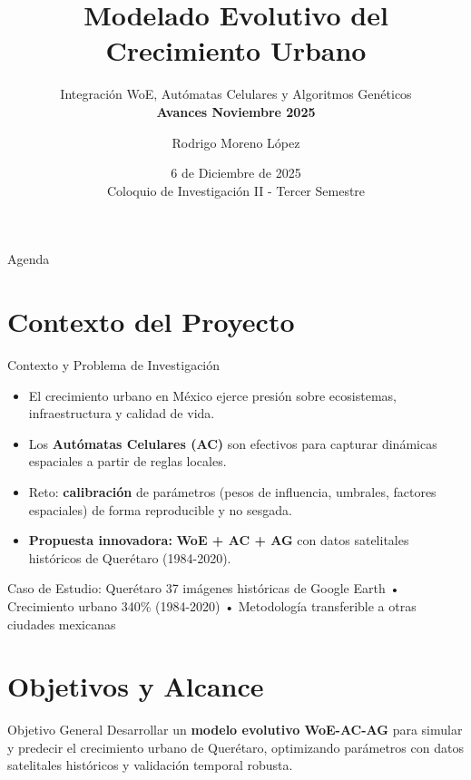 \documentclass[aspectratio=169]{beamer}
\title[Avances Tesis - Nov 2025]{Modelado Evolutivo del Crecimiento Urbano}
\subtitle{Integración WoE, Autómatas Celulares y Algoritmos Genéticos \\ \textbf{Avances Noviembre 2025}}
\author{Rodrigo Moreno López}
\institute{Maestría en Ciencias de la Computación \\ Universidad Nacional Autónoma de México}
\date{6 de Diciembre de 2025 \\ Coloquio de Investigación II - Tercer Semestre}
\begin{document}
\begin{frame}
  \titlepage
\end{frame}

\begin{frame}{Agenda}
  \tableofcontents[hideallsubsections]
\end{frame}

\section{Contexto del Proyecto}
\begin{frame}{Contexto y Problema de Investigación}
  \begin{itemize}
    \item El crecimiento urbano en México ejerce presión sobre ecosistemas, infraestructura y calidad de vida.
    \item Los \textbf{Autómatas Celulares (AC)} son efectivos para capturar dinámicas espaciales a partir de reglas locales.
    \item Reto: \textbf{calibración} de parámetros (pesos de influencia, umbrales, factores espaciales) de forma reproducible y no sesgada.
    \item \textcolor{UNAMBlue}{\textbf{Propuesta innovadora:}} \textbf{WoE + AC + AG} con datos satelitales históricos de Querétaro (1984-2020).
  \end{itemize}
  
  \vspace{0.3cm}
  \begin{alertblock}{Caso de Estudio: Querétaro}
  \small 37 imágenes históricas de Google Earth • Crecimiento urbano 340\% (1984-2020) • 
  Metodología transferible a otras ciudades mexicanas
  \end{alertblock}
\end{frame}

\section{Objetivos y Alcance}
\begin{frame}{Objetivo General}
  \Large
  \textcolor{UNAMBlue}{Desarrollar un \textbf{modelo evolutivo WoE-AC-AG} para simular y predecir el crecimiento urbano de Querétaro, optimizando parámetros con datos satelitales históricos y validación temporal robusta.}
\end{frame}
\end{document}

